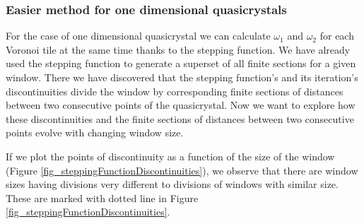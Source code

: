 \documentclass[text.tex]{subfiles}
\begin{document}
\subsubsection{Easier method for one dimensional quasicrystals}
For the case of one dimensional quasicrystal we can calculate $\omega_1$ and $\omega_2$ for each Voronoi tile at the same time thanks to the stepping function. We have already used the stepping function to generate a superset of all finite sections for a given window. There we have discovered that the stepping function's and its iteration's discontinuities divide the window by corresponding finite sections of distances between two consecutive points of the quasicrystal. Now we want to explore how these discontinuities and the finite sections of distances between two consecutive points evolve with changing window size. 

If we plot the points of discontinuity as a function of the size of the window (Figure \ref{fig_steppingFunctionDiscontinuities}), we observe that there are window sizes having divisions very different to divisions of windows with similar size. These are marked with dotted line in Figure \ref{fig_steppingFunctionDiscontinuities}. 
\end{document}
